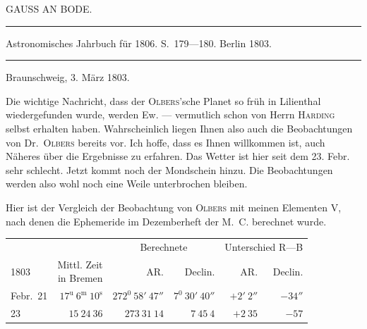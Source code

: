 \bigskip{}
\begin{center}
GAUSS AN BODE.\par
\medskip\hrule\medskip
Astronomisches Jahrbuch für 1806. S.\ 179—180. Berlin 1803.\par
\medskip\hrule
\end{center}\medskip
\begin{flushright}Braunschweig, 3. März 1803.\end{flushright}

Die wichtige Nachricht, dass der \textsc{Olbers}'sche Planet so früh in Lilienthal wiedergefunden wurde, werden Ew. — vermutlich schon von Herrn \textsc{Harding} selbst erhalten haben. Wahrscheinlich liegen Ihnen also auch die Beobachtungen von Dr.\ \textsc{Olbers} bereits vor. Ich hoffe, dass es Ihnen willkommen ist, auch Näheres über die Ergebnisse zu erfahren. Das Wetter ist hier seit dem 23. Febr. sehr schlecht. Jetzt kommt noch der Mondschein hinzu. Die Beobachtungen werden also wohl noch eine Weile unterbrochen bleiben.

Hier ist der Vergleich der Beobachtung von \textsc{Olbers} mit meinen Elementen V, nach denen die Ephemeride im Dezemberheft der M.\ C. berechnet wurde.
\begin{center}
\begingroup\small\setlength{\tabcolsep}{3pt}
\begin{tabular}{l|r|r|r|r|r}
& &\multicolumn{2}{c|}{Berechnete}&\multicolumn{2}{c}{Unterschied R—B}\\
1803&\shortstack{Mittl. Zeit\\in Bremen}&AR.&Declin.&AR.&Declin.\\\hline
Febr.\ 21&$17^{\mathrm u}\ 6^{\mathrm m}\ 10^{\mathrm s}$&$272^0\ 58'\ 47''$&$7^0\ 30'\ 40''$&$+2'\ 2''$&$-34''$\\
23&$15\ 24\ 36$&$273\ 31\ 14$&$7\ 45\ 4$&$+2\ 35$&$-57$
\end{tabular}\endgroup
\end{center}

